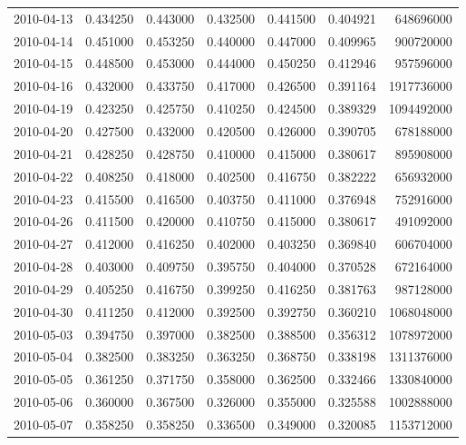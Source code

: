 \begin{tabular}{lrrrrrr}
2010-04-13 &    0.434250 &    0.443000 &    0.432500 &    0.441500 &    0.404921 &   648696000 \\
2010-04-14 &    0.451000 &    0.453250 &    0.440000 &    0.447000 &    0.409965 &   900720000 \\
2010-04-15 &    0.448500 &    0.453000 &    0.444000 &    0.450250 &    0.412946 &   957596000 \\
2010-04-16 &    0.432000 &    0.433750 &    0.417000 &    0.426500 &    0.391164 &  1917736000 \\
2010-04-19 &    0.423250 &    0.425750 &    0.410250 &    0.424500 &    0.389329 &  1094492000 \\
2010-04-20 &    0.427500 &    0.432000 &    0.420500 &    0.426000 &    0.390705 &   678188000 \\
2010-04-21 &    0.428250 &    0.428750 &    0.410000 &    0.415000 &    0.380617 &   895908000 \\
2010-04-22 &    0.408250 &    0.418000 &    0.402500 &    0.416750 &    0.382222 &   656932000 \\
2010-04-23 &    0.415500 &    0.416500 &    0.403750 &    0.411000 &    0.376948 &   752916000 \\
2010-04-26 &    0.411500 &    0.420000 &    0.410750 &    0.415000 &    0.380617 &   491092000 \\
2010-04-27 &    0.412000 &    0.416250 &    0.402000 &    0.403250 &    0.369840 &   606704000 \\
2010-04-28 &    0.403000 &    0.409750 &    0.395750 &    0.404000 &    0.370528 &   672164000 \\
2010-04-29 &    0.405250 &    0.416750 &    0.399250 &    0.416250 &    0.381763 &   987128000 \\
2010-04-30 &    0.411250 &    0.412000 &    0.392500 &    0.392750 &    0.360210 &  1068048000 \\
2010-05-03 &    0.394750 &    0.397000 &    0.382500 &    0.388500 &    0.356312 &  1078972000 \\
2010-05-04 &    0.382500 &    0.383250 &    0.363250 &    0.368750 &    0.338198 &  1311376000 \\
2010-05-05 &    0.361250 &    0.371750 &    0.358000 &    0.362500 &    0.332466 &  1330840000 \\
2010-05-06 &    0.360000 &    0.367500 &    0.326000 &    0.355000 &    0.325588 &  1002888000 \\
2010-05-07 &    0.358250 &    0.358250 &    0.336500 &    0.349000 &    0.320085 &  1153712000 \\

\end{tabular}
